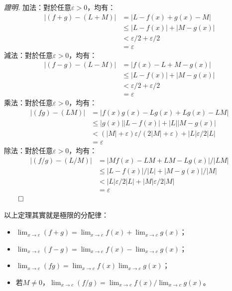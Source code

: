 \documentclass[12pt]{article}
\renewenvironment*{proof}{\textit{證明.}}{\hfill$\qed$}
\begin{document}
    \begin{proof}
        加法：對於任意$\varepsilon>0$，均有：\begin{align*}
            |(f+g)-(L+M)|&=|L-f(x)+g(x)-M|\\
            &\leq|L-f(x)|+|M-g(x)|\\
            &<\varepsilon/2+\varepsilon/2\\
            &=\varepsilon
        \end{align*}
        減法：對於任意$\varepsilon>0$，均有：\begin{align*}
            |(f-g)-(L-M)|&=|f(x)-L+M-g(x)|\\
            &\leq|L-f(x)|+|M-g(x)|\\
            &<\varepsilon/2+\varepsilon/2\\
            &=\varepsilon
        \end{align*}
        乘法：對於任意$\varepsilon>0$，均有：\begin{align*}
            |(fg)-(LM)|&=|f(x)g(x)-Lg(x)+Lg(x)-LM|\\
            &\leq|g(x)||L-f(x)|+|L||M-g(x)|\\
            &<(|M|+\varepsilon)\varepsilon/(2|M|+\varepsilon)+|L|\varepsilon/2|L|\\
            &=\varepsilon
        \end{align*}
        除法：對於任意$\varepsilon>0$，均有：\begin{align*}
            |(f/g)-(L/M)|&=|Mf(x)-LM+LM-Lg(x)|/|LM|\\
            &\leq|L-f(x)|/|L|+|M-g(x)|/|M|\\
            &<|L|\varepsilon/2|L|+|M|\varepsilon/2|M|\\
            &=\varepsilon
        \end{align*}
    \end{proof}

    以上定理其實就是極限的分配律：

    \begin{itemize}
        \item $\displaystyle\lim_{x\to c}(f+g)=\lim_{x\to c}f(x)+\lim_{x\to c}g(x)$；
        \item $\displaystyle\lim_{x\to c}(f-g)=\lim_{x\to c}f(x)-\lim_{x\to c}g(x)$；
        \item $\displaystyle\lim_{x\to c}(fg)=\lim_{x\to c}f(x)\lim_{x\to c}g(x)$；
        \item 若$M\neq 0$，$\displaystyle\lim_{x\to c}(f/g)=\lim_{x\to c}f(x)/\lim_{x\to c}g(x)$。
    \end{itemize}
\end{document}

